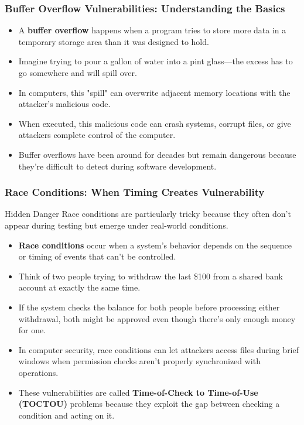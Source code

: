 \documentclass{beamer}
\begin{document}
\begin{frame}
    \frametitle{Buffer Overflow Vulnerabilities: Understanding the Basics}
    
    \begin{itemize}
        \item A \textbf{buffer overflow} happens when a program tries to store more data in a temporary storage area than it was designed to hold.
        \item Imagine trying to pour a gallon of water into a pint glass—the excess has to go somewhere and will spill over.
        \item In computers, this "spill" can overwrite adjacent memory locations with the attacker's malicious code.
        \item When executed, this malicious code can crash systems, corrupt files, or give attackers complete control of the computer.
        \item Buffer overflows have been around for decades but remain dangerous because they're difficult to detect during software development.
    \end{itemize}
\end{frame}

\begin{frame}
    \frametitle{Race Conditions: When Timing Creates Vulnerability}
    
    \begin{alertblock}{Hidden Danger}
        Race conditions are particularly tricky because they often don't appear during testing but emerge under real-world conditions.
    \end{alertblock}
    
    \begin{itemize}
        \item \textbf{Race conditions} occur when a system's behavior depends on the sequence or timing of events that can't be controlled.
        \item Think of two people trying to withdraw the last \$100 from a shared bank account at exactly the same time.
        \item If the system checks the balance for both people before processing either withdrawal, both might be approved even though there's only enough money for one.
        \item In computer security, race conditions can let attackers access files during brief windows when permission checks aren't properly synchronized with operations.
        \item These vulnerabilities are called \textbf{Time-of-Check to Time-of-Use (TOCTOU)} problems because they exploit the gap between checking a condition and acting on it.
    \end{itemize}
\end{frame}
\end{document}
